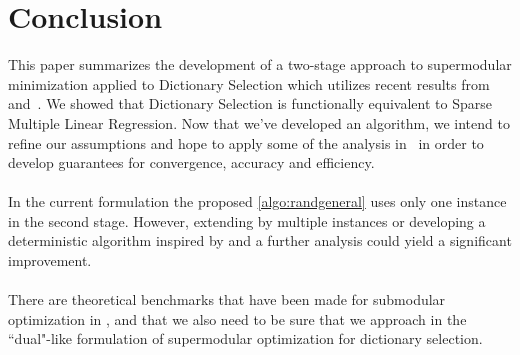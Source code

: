 \documentclass{article}
\begin{document}
\section{Conclusion}\label{sec:conclude}
This paper summarizes the development of a two-stage approach to supermodular minimization applied to Dictionary Selection which utilizes recent results from~\cite{weaklyalpha} and~\cite{Singer16TwoStage}. We showed that Dictionary Selection is functionally equivalent to Sparse Multiple Linear Regression. Now that we've developed an algorithm, we intend to refine our assumptions and hope to apply some of the analysis in~\cite{Singer16TwoStage} in order to develop guarantees for convergence, accuracy and efficiency. 
\\
\\
In the current formulation the proposed \autoref{algo:randgeneral} uses only one instance in the second stage. However, extending by multiple instances or developing a deterministic algorithm inspired by \cite{Singer16TwoStage} and a further analysis could yield a significant improvement.
\\
\\
There are theoretical benchmarks that have been made for submodular optimization in \cite{greedy_selection}, \cite{Krause05near-optimalnonmyopic} and \cite{nonconvexrelax} that we also need to be sure that we approach in the ``dual"-like formulation of supermodular optimization for dictionary selection.


\onehalfspacing


\end{document}
